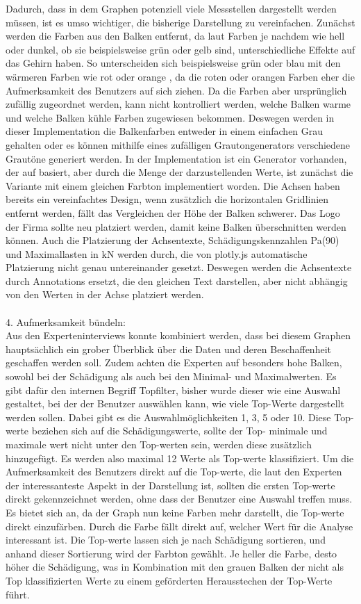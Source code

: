 Dadurch, dass in dem Graphen potenziell viele Messstellen dargestellt werden müssen, ist es umso wichtiger, die bisherige Darstellung zu vereinfachen. Zunächst werden die Farben aus den Balken entfernt, da laut \cite{BO.2019} Farben je nachdem wie hell oder dunkel, ob sie beispielsweise grün oder gelb sind, unterschiedliche Effekte auf das Gehirn haben. So unterscheiden sich beispielsweise grün oder blau mit den wärmeren Farben wie rot oder orange \cite{BO.2019}, da die roten oder orangen Farben eher die Aufmerksamkeit des Benutzers auf sich ziehen. Da die Farben aber ursprünglich zufällig zugeordnet werden, kann nicht kontrolliert werden, welche Balken warme und welche Balken kühle Farben zugewiesen bekommen. Deswegen werden in dieser Implementation die Balkenfarben entweder in einem einfachen Grau gehalten oder es können mithilfe eines zufälligen Grautongenerators verschiedene Grautöne generiert werden. In der Implementation ist ein Generator vorhanden, der auf \cite{Moob.2017} basiert, aber durch die Menge der darzustellenden Werte, ist zunächst die Variante mit einem gleichen Farbton implementiert worden. Die Achsen haben bereits ein vereinfachtes Design, wenn zusätzlich die horizontalen Gridlinien entfernt werden, fällt das Vergleichen der Höhe der Balken schwerer. Das Logo der Firma sollte neu platziert werden, damit keine Balken überschnitten werden können. Auch die Platzierung der Achsentexte, \glqq Schädigungskennzahlen Pa(90) \grqq{} und \glqq Maximallasten in kN\grqq{} werden durch, die von plotly.js automatische Platzierung nicht genau untereinander gesetzt. Deswegen werden die Achsentexte durch Annotations ersetzt, die den gleichen Text darstellen, aber nicht abhängig von den Werten in der Achse platziert werden.\\\\
4. Aufmerksamkeit bündeln:\\
Aus den Experteninterviews konnte kombiniert werden, dass bei diesem Graphen hauptsächlich ein grober Überblick über die Daten und deren Beschaffenheit geschaffen werden soll. Zudem achten die Experten auf besonders hohe Balken, sowohl bei der Schädigung als auch bei den Minimal- und Maximalwerten. Es gibt dafür den internen Begriff Topfilter, bisher wurde dieser wie eine Auswahl gestaltet, bei der der Benutzer auswählen kann, wie viele Top-Werte dargestellt werden sollen. Dabei gibt es die Auswahlmöglichkeiten 1, 3, 5 oder 10. Diese Top-werte beziehen sich auf die Schädigungswerte, sollte der Top- minimale und maximale wert nicht unter den Top-werten sein, werden diese zusätzlich hinzugefügt. Es werden also maximal 12 Werte als Top-werte klassifiziert. Um die Aufmerksamkeit des Benutzers direkt auf die Top-werte, die laut den Experten der interessanteste Aspekt in der Darstellung ist, sollten die ersten Top-werte direkt gekennzeichnet werden, ohne dass der Benutzer eine Auswahl treffen muss. Es bietet sich an, da der Graph nun keine Farben mehr darstellt, die Top-werte direkt einzufärben. Durch die Farbe fällt direkt auf, welcher Wert für die Analyse interessant ist. Die Top-werte lassen sich je nach Schädigung sortieren, und anhand dieser Sortierung wird der Farbton gewählt. Je heller die Farbe, desto höher die Schädigung, was in Kombination mit den grauen Balken der nicht als Top klassifizierten Werte zu einem geförderten Herausstechen der Top-Werte führt.
